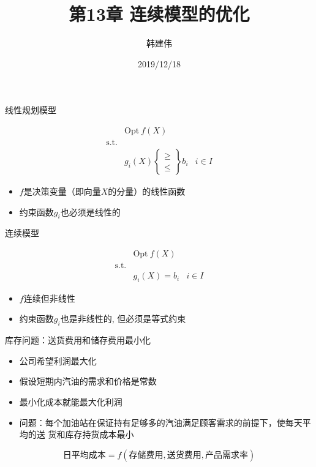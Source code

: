 \documentclass[UTF8]{ctexbeamer}
\title{第13章 连续模型的优化}
\author{韩建伟}
\institute{
  信息学院\\
  \texttt{hanjianwei@zjgsu.edu.cn}
}
\date{2019/12/18}
\begin{document}
\begin{frame}[plain]
  \titlepage{}
\end{frame}

\begin{frame}{线性规划模型}
  \begin{block}{}
    \[ 
    \begin{array}{lcl}
      & \mbox{Opt}\ f(X) & \\
      \mbox{s.t.} & &  \\
      &
      g_i(X) \left\{
        \begin{array}{c}
          \ge\\
          \le
        \end{array}
      \right\} b_i& i \in I
    \end{array}
    \]
  \end{block}

  \begin{itemize}
  \item $f$是决策变量（即向量$X$的分量）的线性函数
  \item 约束函数$g_i$也必须是线性的
  \end{itemize}
  
\end{frame}

\begin{frame}{连续模型}
  \begin{block}{}
    \[ 
    \begin{array}{lcl}
      & \mbox{Opt}\ f(X) & \\
      \mbox{s.t.} & &  \\
      &
      g_i(X) = b_i& i \in I
    \end{array}
    \]
  \end{block}

  \begin{itemize}
  \item $f$连续但非线性
  \item 约束函数$g_i$也是非线性的, 但必须是等式约束
  \end{itemize}
  
\end{frame}

\begin{frame}{库存问题：送货费用和储存费用最小化}

  \begin{itemize}
  \item<1-> 公司希望利润最大化
  \item<2-> 假设短期内汽油的需求和价格是常数
  \item<3-> 最小化成本就能最大化利润
  \item<4-> 问题：每个加油站在保证持有足够多的汽油满足顾客需求的前提下，使每天平均的送
    货和库存持货成本最小 
  \end{itemize}

   {
    \[
      \text{日平均成本} = f(\text{存储费用}, \text{送货费用}, \text{产品需求率})
    \]
  }
  
\end{frame}
\end{document}

